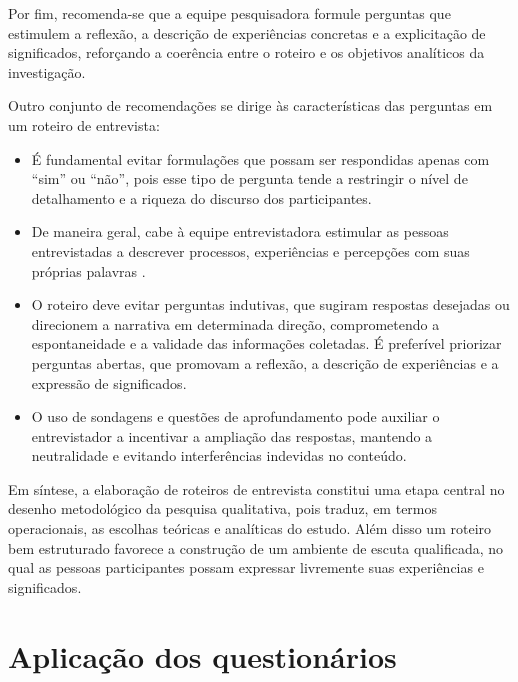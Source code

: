 \documentclass[12pt, a4paper, openany]{book}
\begin{document}
Por fim, recomenda-se que a equipe pesquisadora formule perguntas que estimulem a reflex\~ao, a descri\c{c}\~ao de experi\^encias concretas e a explicita\c{c}\~ao de significados, refor\c{c}ando a coer\^encia entre o roteiro e os objetivos anal\'iticos da investiga\c{c}\~ao.

Outro conjunto de recomenda\c{c}\~oes se dirige \`as caracter\'isticas das perguntas em um roteiro de entrevista:

\begin{itemize}
\item \'E fundamental evitar formula\c{c}\~oes que possam ser respondidas apenas com ``sim'' ou ``n\~ao'', pois esse tipo de pergunta tende a restringir o n\'ivel de detalhamento e a riqueza do discurso dos participantes.
\item De maneira geral, cabe \`a equipe entrevistadora estimular as pessoas entrevistadas a descrever processos, experi\^encias e percep\c{c}\~oes com suas pr\'oprias palavras \citep{roulston2013asking}.
\item O roteiro deve evitar perguntas indutivas, que sugiram respostas desejadas ou direcionem a narrativa em determinada dire\c{c}\~ao, comprometendo a espontaneidade e a validade das informa\c{c}\~oes coletadas. \'E prefer\'ivel priorizar perguntas abertas, que promovam a reflex\~ao, a descri\c{c}\~ao de experi\^encias e a express\~ao de significados.
\item O uso de sondagens e quest\~oes de aprofundamento pode auxiliar o entrevistador a incentivar a amplia\c{c}\~ao das respostas, mantendo a neutralidade e evitando interfer\^encias indevidas no conte\'udo.
\end{itemize}

Em s\'intese, a elabora\c{c}\~ao de roteiros de entrevista constitui uma etapa central no desenho metodol\'ogico da pesquisa qualitativa, pois traduz, em termos operacionais, as escolhas te\'oricas e anal\'iticas do estudo. Al\'em disso um roteiro bem estruturado favorece a constru\c{c}\~ao de um ambiente de escuta qualificada, no qual as pessoas participantes possam expressar livremente suas experi\^encias e significados.

\chapter{Aplica\c{c}\~ao dos question\'arios}
\end{document}
